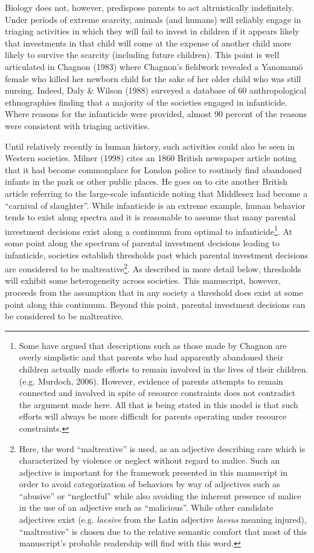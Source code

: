 \documentclass[review]{elsarticle}\usepackage[]{graphicx}\usepackage[]{color}
\begin{document}
Biology does not, however, predispose parents to act altruistically
indefinitely. Under periods of extreme scarcity, animals (and humans)
will reliably engage in triaging activities in which they will fail to
invest in children if it appears likely that investments in that child
will come at the expense of another child more likely to survive the
scarcity (including future children). This point is well articulated in
Chagnon (1983) where Chagnon's fieldwork revealed a Yanomamö female who
killed her newborn child for the sake of her older child who was still
nursing. Indeed, Daly \& Wilson (1988) surveyed a database of 60
anthropological ethnographies finding that a majority of the societies
engaged in infanticide. Where reasons for the infanticide were provided,
almost 90 percent of the reasons were consistent with triaging
activities.

Until relatively recently in human history, such activities could also
be seen in Western societies. Milner (1998) cites an 1860 British
newspaper article noting that it had become commonplace for London
police to routinely find abandoned infants in the park or other public
places. He goes on to cite another British article referring to the
large-scale infanticide noting that Middlesex had become a ``carnival of
slaughter''. While infanticide is an extreme example, human behavior
tends to exist along spectra and it is reasonable to assume that many
parental investment decisions exist along a continuum from optimal to
infanticide\footnote{Some have argued that descriptions such as those
  made by Chagnon are overly simplistic and that parents who had
  apparently abandoned their children actually made efforts to remain
  involved in the lives of their children. (e.g. Murdoch, 2006).
  However, evidence of parents attempts to remain connected and involved
  in spite of resource constraints does not contradict the argument made
  here. All that is being stated in this model is that such efforts will
  always be more difficult for parents operating under resource
  constraints.}. At some point along the spectrum of parental investment
decisions leading to infanticide, societies establish thresholds past
which parental investment decisions are considered to be
maltreative\footnote{Here, the word ``maltreative'' is used, as an
  adjective describing care which is characterized by violence or
  neglect without regard to malice. Such an adjective is important for
  the framework presented in this manuscript in order to avoid
  categorization of behaviors by way of adjectives such as ``abusive''
  or ``neglectful'' while also avoiding the inherent presence of malice
  in the use of an adjective such as ``malicious''. While other
  candidate adjectives exist (e.g. \emph{laesive} from the Latin
  adjective \emph{laesus} meaning injured), ``maltreative'' is chosen
  due to the relative semantic comfort that most of this manuscript's
  probable readership will find with this word.}. As described in more
detail below, thresholds will exhibit some heterogeneity across
societies. This manuscript, however, proceeds from the assumption that
in any society a threshold does exist at some point along this
continuum. Beyond this point, parental investment decisions can be
considered to be maltreative.
\end{document}
